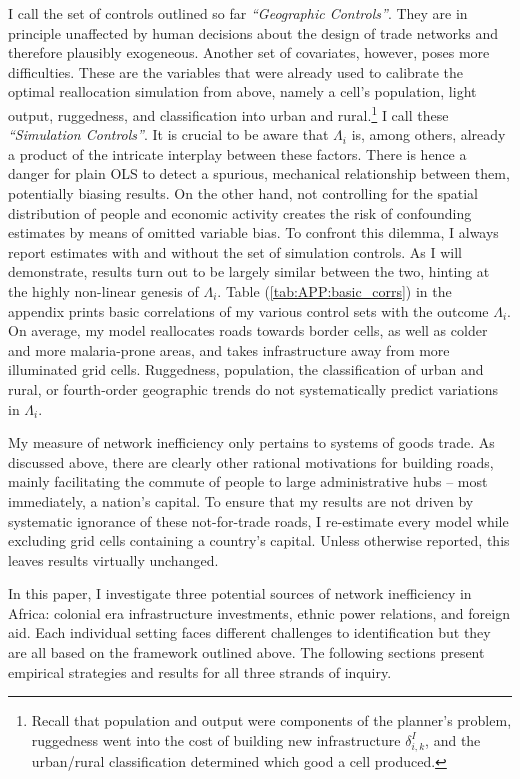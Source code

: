 \documentclass[11pt, oneside]{article}   	%
\let\oldref\ref
\renewcommand{\ref}[1]{(\oldref{#1})}
\begin{document}
I call the set of controls outlined so far \emph{``Geographic Controls''}. They are in principle unaffected by human decisions about the design of trade networks and therefore plausibly exogeneous. Another set of covariates, however, poses more difficulties. These are the variables that were already used to calibrate the optimal reallocation simulation from above, namely a cell's population, light output, ruggedness, and classification into urban and rural.\footnote{Recall that population and output were components of the planner's problem, ruggedness went into the cost of building new infrastructure $\delta^{I}_{i,k}$, and the urban/rural classification determined which good a cell produced.} I call these \emph{``Simulation Controls''}. It is crucial to be aware that $\Lambda_{i}$ is, among others, already a product of the intricate interplay between these factors. There is hence a danger for plain OLS to detect a spurious, mechanical relationship between them, potentially biasing results. On the other hand, not controlling for the spatial distribution of people and economic activity creates the risk of confounding estimates by means of omitted variable bias. To confront this dilemma, I always report estimates with and without the set of simulation controls. As I will demonstrate, results turn out to be largely similar between the two, hinting at the highly non-linear genesis of $\Lambda_{i}$. Table \ref{tab:APP:basic_corrs} in the appendix prints basic correlations of my various control sets with the outcome $\Lambda_{i}$. On average, my model reallocates roads towards border cells, as well as colder and more malaria-prone areas, and takes infrastructure away from more illuminated grid cells. Ruggedness, population, the classification of urban and rural, or fourth-order geographic trends do not systematically predict variations in $\Lambda_{i}$.

My measure of network inefficiency only pertains to systems of goods trade. As discussed above, there are clearly other rational motivations for building roads, mainly facilitating the commute of people to large administrative hubs -- most immediately, a nation's capital. To ensure that my results are not driven by systematic ignorance of these not-for-trade roads, I re-estimate every model while excluding grid cells containing a country's capital. Unless otherwise reported, this leaves results virtually unchanged.

In this paper, I investigate three potential sources of network inefficiency in Africa: colonial era infrastructure investments, ethnic power relations, and foreign aid. Each individual setting faces different challenges to identification but they are all based on the framework outlined above. The following sections present empirical strategies and results for all three strands of inquiry.
\end{document}
